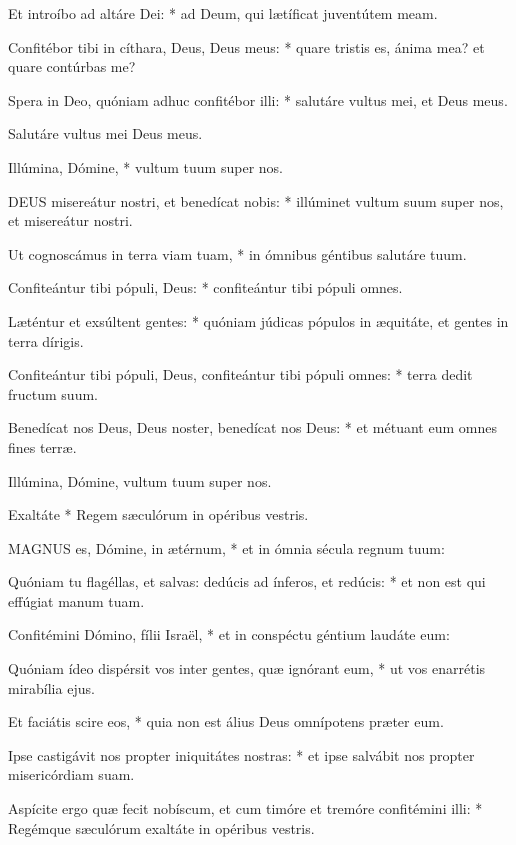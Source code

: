 Et introíbo ad altáre Dei: * ad Deum, qui lætíficat juventútem meam.

Confitébor tibi in cíthara, Deus, Deus meus: * quare tristis es, ánima mea? et quare contúrbas me?

Spera in Deo, quóniam adhuc confitébor illi: * salutáre vultus mei, et Deus meus.

 Salutáre vultus mei Deus meus.

 Illúmina, Dómine, * vultum tuum super nos.


\lettrine[lines=2]{D}{EUS} misereátur nostri, et benedícat nobis: * illúminet vultum suum super nos, et misereátur nostri.

Ut cognoscámus in terra viam tuam, * in ómnibus géntibus salutáre tuum.

Confiteántur tibi pópuli, Deus: * confiteántur tibi pópuli omnes.

Læténtur et exsúltent gentes: * quóniam júdicas pópulos in æquitáte, et gentes in terra dírigis.

Confiteántur tibi pópuli, Deus, confiteántur tibi pópuli omnes: * terra dedit fructum suum.

Benedícat nos Deus, Deus noster, benedícat nos Deus: * et métuant eum omnes fines terræ.

 Illúmina, Dómine, vultum tuum super nos.

 Exaltáte * Regem sæculórum in opéribus vestris.


\lettrine[lines=2]{M}{AGNUS} es, Dómine, in ætérnum, * et in ómnia sécula regnum tuum:

Quóniam tu flagéllas, et salvas: dedúcis ad ínferos, et redúcis: * et non est qui effúgiat manum tuam.

Confitémini Dómino, fílii Israël, * et in conspéctu géntium laudáte eum:

Quóniam ídeo dispérsit vos inter gentes, quæ ignórant eum, * ut vos enarrétis mirabília ejus.

Et faciátis scire eos, * quia non est álius Deus omnípotens præter eum.

Ipse castigávit nos propter iniquitátes nostras: * et ipse salvábit nos propter misericórdiam suam.

Aspícite ergo quæ fecit nobíscum, et cum timóre et tremóre confitémini illi: * Regémque sæculórum exaltáte in opéribus vestris.

